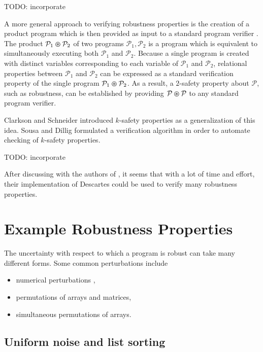 \documentclass{llncs}
\begin{document}
    TODO: incorporate

    A more general approach to verifying robustness properties is the creation of a
    product program which is then provided as input to a standard program verifier
    \cite{bartheproduct}.  The product \(\mathcal{P}_{1} \varoast \mathcal{P}_{2}\)
    of two programs \(\mathcal{P}_{1}, \mathcal{P}_{2}\) is a program which is
    equivalent to simultaneously executing both \(\mathcal{P}_{1}\) and
    \(\mathcal{P}_{2}\).  Because a single program is created with distinct
    variables corresponding to each variable of \(\mathcal{P}_{1}\) and
    \(\mathcal{P}_{2}\), relational properties between \(\mathcal{P}_{1}\) and
    \(\mathcal{P}_{2}\) can be expressed as a standard verification property of the
    single program \(\mathcal{P}_{1} \varoast \mathcal{P}_{2}\).  As a result, a
    \(2\)-safety property about \(\mathcal{P}\), such as robustness, can be
    established by providing \(\mathcal{P} \varoast \mathcal{P}\) to any standard
    program verifier.

    \space\space Clarkson and Schneider
    \cite{clarkson08} introduced \(k\)-safety properties as a generalization of this
    idea.  Sousa and Dillig \cite{sousa16} formulated a verification algorithm in
    order to automate checking of \(k\)-safety properties.
    \smallskip 

    TODO: incorporate

    After discussing with the authors of \cite{sousa16}, it seems that with a lot of
    time and effort, their implementation of Descartes could be used to verify many
    robustness properties.

\section{Example Robustness Properties}

  The uncertainty with respect to which a program is robust can take many
  different forms.  Some common perturbations include
  \begin{itemize}
    \item numerical perturbations \cite{samanta14,chaudhuri10,chaudhuri11},
    \item permutations of arrays and matrices,
    \item simultaneous permutations of arrays.
  \end{itemize}

  \subsection{Uniform noise and list sorting}
\end{document}
